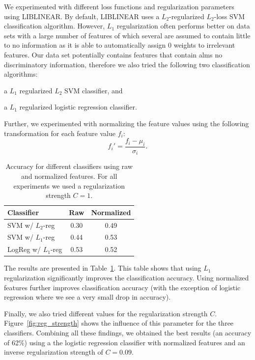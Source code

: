 \documentclass[twocolumn, 11pt]{article}
\begin{document}
We experimented with different loss functions and regularization 
parameters using LIBLINEAR.  By default, LIBLINEAR uses a $L_2$-regularized 
$L_2$-loss SVM classification algorithm. However, $L_1$ regularization often performs better 
on  data sets with a large number of features of which several are assumed to contain little to no information
as it is able to automatically assign 0 weights to irrelevant features.
Our data set potentially contains features that contain alms no discriminatory information, 
therefore we also tried the following two classification algorithms: \begin{inparaenum}[1)] 
\item a $L_1$ regularized $L_2$ SVM classifier, and \item a $L_1$ regularized 
logistic regression classifier. \end{inparaenum} Further, we experimented with normalizing the feature
values using the following transformation for each feature value $f_i$:
$$f_i' =  \frac{f_i - \mu_i}{\sigma_i}.$$ 

\begin{table}[b]\centering
  \begin{tabular}{lcc}
    \toprule
    Classifier & Raw  & Normalized \\
    \midrule
    SVM w/ $L_2$-reg & 0.30 & 0.49 \\
    SVM w/ $L_1$-reg & 0.44 & 0.53 \\
    LogReg w/ $L_1$-reg & 0.53 & 0.52  \\
    \bottomrule
  \end{tabular}
  \caption{Accuracy for different classifiers using raw and normalized features. For all experiments we used a regularization strength $C=1$.}\label{tab:results}
\end{table}


The results are presented in Table~\ref{tab:results}. This table shows that using $L_1$ 
regularization significantly improves the classification accuracy. Using 
normalized features further improves classification accuracy 
(with the exception of logistic regression where we see a very small drop in accuracy). 

Finally, we also tried different values for the regularization strength $C$. Figure~\ref{fig:reg_strength} shows
the influence of this parameter for the three classifiers. 
Combining all these findings, we obtained the best results (an accuracy of 62\%)
using a the logistic regression classifier with normalized features and an inverse regularization
strength of $C=0.09$.
\end{document}
